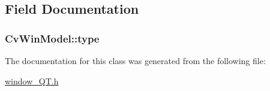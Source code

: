 \subsection{Field Documentation}
\hypertarget{classCvWinModel_a6b9598fed3bff14f0c10ec85a20ed83e}{
\subsubsection[{type}]{ Cv\-Win\-Model\-::type}}\label{classCvWinModel_a6b9598fed3bff14f0c10ec85a20ed83e}


The documentation for this class was generated from the following file\-:\begin{DoxyCompactItemize}
\item 
\hyperlink{window__QT_8h}{window\-\_\-\-Q\-T.\-h}\end{DoxyCompactItemize}
